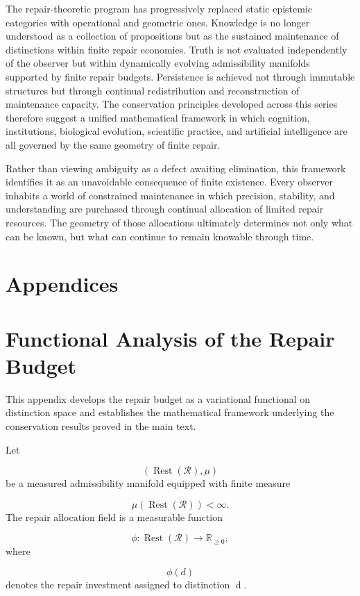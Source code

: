 \documentclass[12pt,oneside]{article}
\theoremstyle{plain}
\theoremstyle{definition}
\theoremstyle{remark}
\DeclareMathOperator{\Rest}{Rest}
\begin{document}
The repair-theoretic program has progressively replaced static epistemic categories with operational and geometric ones. Knowledge is no longer understood as a collection of propositions but as the sustained maintenance of distinctions within finite repair economies. Truth is not evaluated independently of the observer but within dynamically evolving admissibility manifolds supported by finite repair budgets. Persistence is achieved not through immutable structures but through continual redistribution and reconstruction of maintenance capacity. The conservation principles developed across this series therefore suggest a unified mathematical framework in which cognition, institutions, biological evolution, scientific practice, and artificial intelligence are all governed by the same geometry of finite repair.

Rather than viewing ambiguity as a defect awaiting elimination, this framework identifies it as an unavoidable consequence of finite existence. Every observer inhabits a world of constrained maintenance in which precision, stability, and understanding are purchased through continual allocation of limited repair resources. The geometry of those allocations ultimately determines not only what can be known, but what can continue to remain knowable through time.


\newpage 
\section*{Appendices}

\section{Functional Analysis of the Repair Budget}

This appendix develops the repair budget as a variational functional on distinction space and establishes the mathematical framework underlying the conservation results proved in the main text.

Let

\[
(\Rest(\mathcal R),\mu)
\]
be a measured admissibility manifold equipped with finite measure

\[
\mu(\Rest(\mathcal R))<\infty.
\]
The repair allocation field is a measurable function

\[
\phi:\Rest(\mathcal R)\rightarrow\mathbb R_{\ge0},
\]
where

\[
\phi(d)
\]
denotes the repair investment assigned to distinction d.
\end{document}
